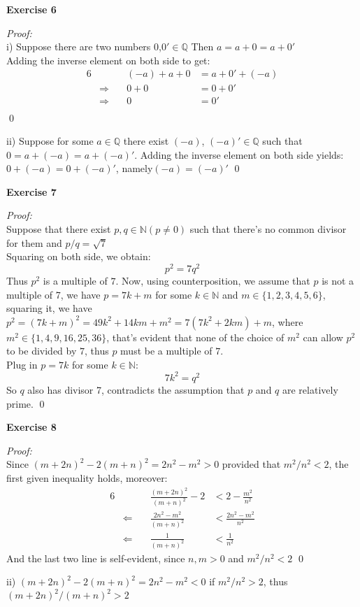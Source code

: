 \documentclass[12pt]{article}
\begin{document}
\textbf{Exercise 6}\par
\textit{Proof:} \\
i) Suppose there are two numbers 0,$0'\in\mathbb{Q}$
Then $a=a+0=a+0'$\\
Adding the inverse element on both side to get:
\begin{alignat*}{6}
&\quad &(-a)+a+0&=a+0'+(-a)\\
&\Longrightarrow\quad &0+0&=0+0'\\
&\Longrightarrow &0&=0'\\
\end{alignat*}
\qed
\par
ii) Suppose for some $a\in\mathbb{Q}$ there exist $(-a)$, $(-a)'\in\mathbb{Q}$ such that $0=a+(-a)=a+(-a)'$. 
Adding the inverse element on both side yields:
$0+(-a)=0+(-a)'$, namely$(-a)=(-a)'$
\qed
\par

\textbf{Exercise 7}\par
\textit{Proof:} \\
Suppose that there exist $p,q\in\mathbb{N}(p\neq 0)$ such that there's no common divisor for them and $p/q=\sqrt{7}$\\
Squaring on both side, we obtain:
\[
p^2=7q^2
\]
Thus $p^2$ is a multiple of $7$. Now, using counterposition, we assume that $p$ is not a multiple of 7, we have $p=7k+m$ for some $k\in \mathbb{N}$ and $m\in\{1,2,3,4,5,6\}$, squaring it, we have $p^2=(7k+m)^2=49k^2+14km+m^2=7(7k^2+2km)+m$, where $m^2\in\{1,4,9,16,25,36\}$, that's evident that none of the choice of $m^2$ can allow $p^2$ to be divided by $7$, thus $p$ must be a multiple of $7$.\\Plug in $p=7k$ for some $k\in \mathbb{N}$:
\[
7k^2=q^2
\]
So $q$ also has divisor 7, contradicts the assumption that $p$ and $q$ are relatively prime.
\qed

\textbf{Exercise 8}\par
\textit{Proof: } \\
Since $(m+2n)^2-2(m+n)^2=2n^2-m^2>0$ provided that $m^2/n^2<2$, the first given inequality holds, moreover:
\begin{alignat*}{6}
&\quad&\frac{(m+2n)^2}{(m+n)^2}-2&<2-\frac{m^2}{n^2}\\
&\Longleftarrow\quad &\frac{2n^2-m^2}{(m+n)^2}&<\frac{2n^2-m^2}{n^2}\\
&\Longleftarrow &\frac{1}{(m+n)^2}&<\frac{1}{n^2}
\end{alignat*}
And the last two line is self-evident, since $n,m>0$ and $m^2/n^2<2$
\qed
\par
ii) $(m+2n)^2-2(m+n)^2=2n^2-m^2<0$ if $m^2/n^2>2$, thus$(m+2n)^2/(m+n)^2>2$\\
\end{document}
